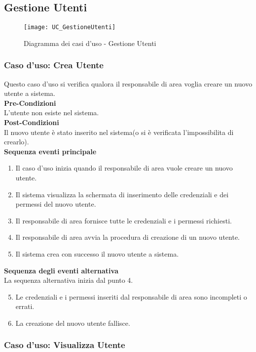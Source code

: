 \documentclass[green, fancy, 11pt]{elegantbook}
\begin{document}
\subsection{Gestione Utenti}
\begin{figure}[H]
	\centering
	\texttt{[image: UC\_GestioneUtenti]}
	\caption{Diagramma dei casi d'uso - Gestione Utenti}
\end{figure}

\subsubsection{Caso d'uso: Crea Utente}

Questo caso d’uso si verifica qualora il responsabile di area voglia creare un nuovo utente a sistema.\\
\textbf{Pre-Condizioni}\\
L’utente non esiste nel sistema.\\
\textbf{Post-Condizioni}\\
Il nuovo utente è stato inserito nel sistema(o si è verificata l’impossibilita di crearlo).\\
\textbf{Sequenza eventi principale}\\
\begin{enumerate}
	\item Il caso d’uso inizia quando il responsabile di area vuole creare un nuovo utente.
	\item Il sistema visualizza la schermata di inserimento delle credenziali e dei permessi del nuovo utente.
	\item Il responsabile di area fornisce tutte le credenziali e i permessi richiesti.
	\item Il responsabile di area avvia la procedura di creazione di un nuovo utente.
	\item Il sistema crea con successo il nuovo utente a sistema.
\end{enumerate}
\textbf{Sequenza degli eventi alternativa}\\
La sequenza alternativa inizia dal punto 4.
\begin{enumerate}
	\setcounter{enumi}{4}
	\item Le credenziali e i permessi inseriti dal responsabile di area sono incompleti o errati.
	\item La creazione del nuovo utente fallisce.
\end{enumerate}
\newpage

\subsubsection{Caso d'uso: Visualizza Utente}
\end{document}
